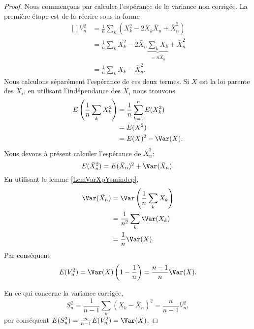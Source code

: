 \begin{proof}
    Nous commençons par calculer l'espérance de la variance non corrigée. La première étape est de la récrire sous la forme
    \begin{equation}
        \begin{aligned}[]
            V_n^2&=\frac{1}{ n }\sum_k(X_k^2-2X_k\bar X_n+\bar X_n^2)\\
            &=\frac{1}{ n }\sum_kX_k^2-2\bar X_n\underbrace{\sum_kX_k}_{=n\bar X_n}+\bar X_n^2\\
            &=\frac{1}{ n }\sum_k X_k-\bar X_n^2.
        \end{aligned}
    \end{equation}
    Nous calculons séparément l'espérance de ces deux termes. Si \( X\) est la loi parente des \( X_i\), en utilisant l'indépendance des \( X_i\) nous trouvons
    \begin{equation}
        \begin{aligned}[]
            E\left( \frac{1}{ n }\sum_kX_k^2 \right)&=\frac{1}{ n }\sum_{k=1}^nE(X_k^2)\\
            &=E(X^2)\\
            &=E(X)^2-\Var(X).
        \end{aligned}
    \end{equation}
    Nous devons à présent calculer l'espérance de \( \bar X_n^2\):
    \begin{equation}
        E(\bar X_n^2)=E(\bar X_n)^2+\Var(\bar X_n).
    \end{equation}
    En utilisant le lemme \ref{LemVarXpYsmindep},
    \begin{subequations}
        \begin{align}
            \Var(\bar X_n)&=\Var\left( \frac{1}{ n }\sum_kX_k \right)\\
            &=\frac{1}{ n^2 }\sum_k\Var(X_k)\\
            &=\frac{1}{ n }\Var(X).
        \end{align}
    \end{subequations}
    Par conséquent
    \begin{equation}
        E(V_n^2)=\Var(X)\left( 1-\frac{1}{ n } \right)=\frac{ n-1 }{ n }\Var(X).
    \end{equation}

    En ce qui concerne la variance corrigée,
    \begin{equation}
        S_n^2=\frac{1}{ n-1 }\sum_k(X_k-\bar X_n)^2=\frac{ n }{ n-1 }V_n^2,
    \end{equation}
    par conséquent \( E(S_n^2)=\frac{ n }{ n-1 }E(V_n^2)=\Var(X)\).
\end{proof}

